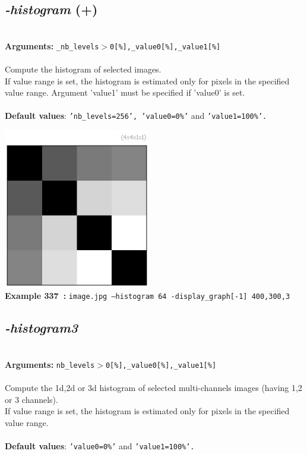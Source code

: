 \documentclass[a4paper,11pt,twoside]{book}
\begin{document}
\subsection{\emph{-histogram} (+)}\vspace*{-0.5em}
~\\\textbf{Arguments: } 
{\small \texttt{\_nb\_levels$>$0[\%],\_value0[\%],\_value1[\%]}}\\~\\
Compute the histogram of selected images.
~\\If value range is set, the histogram is estimated only for pixels in the specified
value range. Argument 'value1' must be specified if 'value0' is set.
~\\~\\\textbf{Default values}: {\small \texttt{'nb\_levels=256', 'value0=0\%'} and \texttt{'value1=100\%'.}}
\begin{center}\includegraphics[keepaspectratio=true,height=7cm,width=\textwidth]{img/gmic_def337.jpg}\\
{\footnotesize \textbf{Example 337~:} \texttt{image.jpg --histogram 64 -display\_graph[-1] 400,300,3}}
\end{center}

\subsection{\emph{-histogram3} }\vspace*{-0.5em}
~\\\textbf{Arguments: } 
{\small \texttt{nb\_levels$>$0[\%],\_value0[\%],\_value1[\%]}}\\~\\
Compute the 1d,2d or 3d histogram of selected multi-channels images (having 1,2 or 3 channels).
~\\If value range is set, the histogram is estimated only for pixels in the specified
value range.
~\\~\\\textbf{Default values}: {\small \texttt{'value0=0\%'} and \texttt{'value1=100\%'.}}
\end{document}
